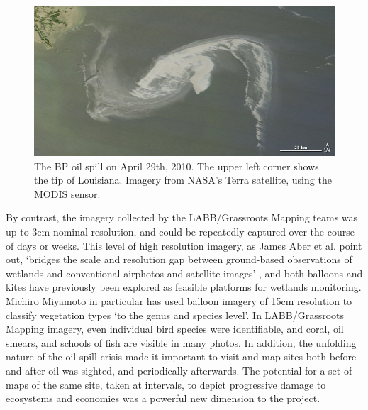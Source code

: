 \documentclass[11pt,oneside,notitlepage]{report}
\begin{document}
{{\begin{figure}[h]
  \begin{center}
	\includegraphics[width=1\textwidth]{images/nasa-modis-small.jpg}
	\caption{The BP oil spill on April 29th, 2010. The upper left corner shows the tip of Louisiana. Imagery from NASA's Terra satellite, using the MODIS sensor.}
  \end{center}
\end{figure}

By contrast, the imagery collected by the LABB/Grassroots Mapping teams was up to 3cm nominal resolution, and could be repeatedly captured over the course of days or weeks. This level of high resolution imagery, as James Aber et al. point out, `bridges the scale and resolution gap between ground-based observations of wetlands and conventional airphotos and satellite images' \cite{aber2002unmanned}, and both balloons and kites have previously been explored as feasible platforms for wetlands monitoring. \cite{aber2002unmanned}\cite{miyamoto2004use} Michiro Miyamoto in particular has used balloon imagery of 15cm resolution to classify vegetation types `to the genus and species level'. \cite{miyamoto2004use} In \ac{LABB}/Grassroots Mapping imagery, even individual bird species were identifiable, and coral, oil smears, and schools of fish are visible in many photos. In addition, the unfolding nature of the oil spill crisis made it important to visit and map sites both before and after oil was sighted, and periodically afterwards. The potential for a set of maps of the same site, taken at intervals, to depict progressive damage to ecosystems and economies was a powerful new dimension to the project.  

}}
\end{document}
